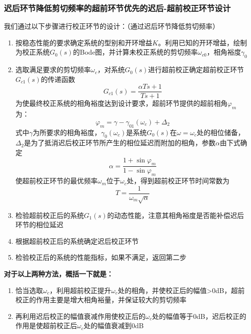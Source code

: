 \subsubsection{迟后环节降低剪切频率的超前环节优先的迟后-超前校正环节设计}
我们通过以下步骤进行校正环节的设计：（通过迟后环节降低剪切频率）
\begin{enumerate}
    \item 按稳态性能的要求确定系统的型别和开环增益$K$。利用已知的开环增益，绘制为校正系统$G_0(s)$的Bode图，并计算未校正系统的剪切频率$\omega_{c0}$，相角裕度$\gamma_0$
    \item 选取满足要求的剪切频率$\omega_c$，对系统$G_{0}(s)$进行超前校正确定超前校正环节$G_{c1}(s)$的传递函数
    \begin{equation*}
        G_{c1}(s) = \frac{\alpha T s + 1}{Ts+1}
    \end{equation*}
    为使最终校正系统的相角裕度达到设计要求，超前环节提供的超前相角$\varphi_m$为：
    \begin{equation*}
        \varphi_m = \gamma - \gamma_{01}(\omega_{c})  + \Delta_2
    \end{equation*}
    式中$\gamma$为所要求的相角裕度，$\gamma_{0}(\omega_{c})$是系统$G_{0}(s)$在$\omega = \omega_{c}$处的相位储备，$\Delta_2$是为了抵消迟后校正环节所产生的相位延迟而附加的相角，参数$\alpha$由下式确定
    \begin{equation*}
        \alpha = \frac{1+\sin\varphi_m}{1-\sin\varphi_m}
    \end{equation*}
    使超前校正环节的最优频率$\omega_m$位于$\omega_c$处，得到超前校正环节时间常数为
    \begin{equation*}
        T = \frac{1}{\omega_m \sqrt{\alpha}}
    \end{equation*}
    \item 检验超前校正后的系统$G_1(s)$的动态性能，注意其相角裕度是否能补偿迟后环节的相位延迟
    \item 根据超前校正后的系统确定迟后校正环节
    \item 检验校正后的系统的性能指标，如果不满足，返回第二步
\end{enumerate}

\textbf{对于以上两种方法，概括一下就是：}
\begin{enumerate}
    \item 恰当选取$\omega_c$，利用超前校正提升$\omega_c$处的相角，并使校正后的幅值>0dB，超前校正的作用主要是增大相角裕量，并保证较大的剪切频率
    \item 再利用迟后校正的幅值衰减作用使校正后的$\omega_c$处的幅值等于0dB，迟后校正的作用是使超前校正后$\omega_c$处的幅值衰减到0dB
\end{enumerate}

